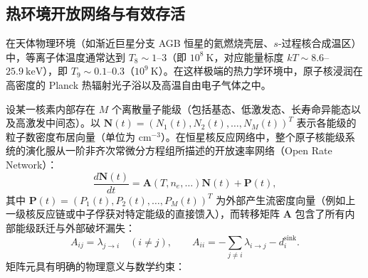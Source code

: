 \subsection{热环境开放网络与有效存活}\label{sec:4-8-1}

在天体物理环境（如渐近巨星分支 AGB 恒星的氦燃烧壳层、$s$-过程核合成温区）中，等离子体温度通常达到 $T_8 \sim 1$--$3$（即 $10^8\ \mathrm{K}$，对应能量标度 $kT \sim 8.6$--$25.9\ \mathrm{keV}$），即 $T_9 \sim 0.1$--$0.3$（$10^9\ \mathrm{K}$）。在这样极端的热力学环境中，原子核浸润在高密度的 Planck 热辐射光子浴以及高温自由电子气体之中。

设某一核素内部存在 $M$ 个离散量子能级（包括基态、低激发态、长寿命异能态以及高激发中间态）。以 $\mathbf{N}(t) = (N_1(t), N_2(t), \dots, N_M(t))^T$ 表示各能级的粒子数密度布居向量（单位为 $\mathrm{cm}^{-3}$）。在恒星核反应网络中，整个原子核能级系统的演化服从一阶非齐次常微分方程组所描述的开放速率网络（Open Rate Network）：
\begin{equation}\label{eq:4-8-network-master}
\frac{d \mathbf{N}(t)}{dt} = \mathbf{A}(T, n_e, \dots) \mathbf{N}(t) + \mathbf{P}(t),
\end{equation}
其中 $\mathbf{P}(t) = (P_1(t), P_2(t), \dots, P_M(t))^T$ 为外部产生流密度向量（例如上一级核反应链或中子俘获对特定能级的直接馈入），而转移矩阵 $\mathbf{A}$ 包含了所有内部能级跃迁与外部破坏漏失：
\begin{equation}\label{eq:4-8-matrix-elements}
A_{ij} = \lambda_{j \to i} \quad (i \ne j), \qquad
A_{ii} = -\sum_{j \ne i} \lambda_{i \to j} - d_i^{\mathrm{sink}}.
\end{equation}
矩阵元具有明确的物理意义与数学约束：
